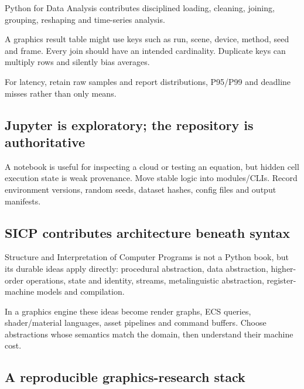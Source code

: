 \hypertarget{01-foundations-i-ch017-pandas-is-a-relational-layer-for-experiments}{}

Python for Data Analysis contributes disciplined loading, cleaning, joining, grouping, reshaping and time-series analysis.

A graphics result table might use keys such as run, scene, device, method, seed and frame. Every join should have an intended cardinality. Duplicate keys can multiply rows and silently bias averages.

For latency, retain raw samples and report distributions, P95/P99 and deadline misses rather than only means.

\subsection{Jupyter is exploratory; the repository is authoritative}\label{01-foundations-i-ch017-jupyter-is-exploratory-the-repository-is-authoritative}

\hypertarget{01-foundations-i-ch017-jupyter-is-exploratory-the-repository-is-authoritative}{}

A notebook is useful for inspecting a cloud or testing an equation, but hidden cell execution state is weak provenance. Move stable logic into modules/CLIs. Record environment versions, random seeds, dataset hashes, config files and output manifests.

\subsection{SICP contributes architecture beneath syntax}\label{01-foundations-i-ch017-sicp-contributes-architecture-beneath-syntax}

\hypertarget{01-foundations-i-ch017-sicp-contributes-architecture-beneath-syntax}{}

Structure and Interpretation of Computer Programs is not a Python book, but its durable ideas apply directly: procedural abstraction, data abstraction, higher-order operations, state and identity, streams, metalinguistic abstraction, register-machine models and compilation.

In a graphics engine these ideas become render graphs, ECS queries, shader/material languages, asset pipelines and command buffers. Choose abstractions whose semantics match the domain, then understand their machine cost.

\subsection{A reproducible graphics-research stack}\label{01-foundations-i-ch017-a-reproducible-graphics-research-stack}

